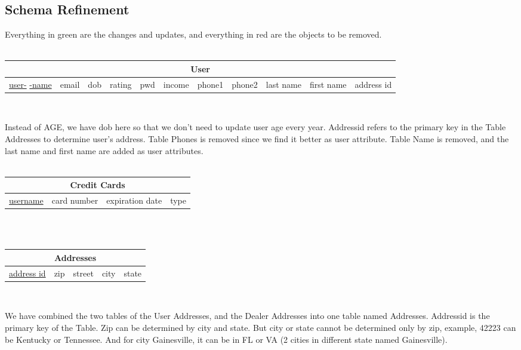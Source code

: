 \documentclass[12pt]{article}
\begin{document}
\subsection{Schema Refinement}
\par Everything in green are the changes and updates, and everything in red are the objects to be removed.\\\\
\begin{tabularx}{\textwidth}{|X|X|X|X|X|X|X|X|X|X|X|}
\hline
\multicolumn{11}{|c|}{User}\\\hline
\scriptsize \underline{user-} \underline{-name} & \scriptsize email & \scriptsize\cellcolor{green!25}dob & \scriptsize rating & \scriptsize pwd & \scriptsize income & \scriptsize\cellcolor{green!25} phone1 & \scriptsize\cellcolor{green!25} phone2 & \scriptsize\cellcolor{green!25} last name & \scriptsize\cellcolor{green!25} first name & \scriptsize\cellcolor{green!25} address id\\\hline
\end{tabularx}
~\\
\par Instead of AGE, we have dob here so that we don't need to update user age every year. Addressid refers to the primary key in the Table Addresses to determine user's address. Table Phones is removed since we find it better as user attribute. Table Name is removed, and the last name and first name are added as user attributes.\\
~\\
\begin{tabularx}{\textwidth}{|X|X|X|X|}
\hline
\multicolumn{4}{|c|}{Credit Cards}\\\hline
\underline{username} & card number & expiration date & type\\\hline
\end{tabularx}
~\\~\\
\begin{tabularx}{\textwidth}{|X|X|X|X|X|}
\hline
\multicolumn{5}{|c|}{\cellcolor{green!25}Addresses}\\\hline
\underline{address id} & \cellcolor{red!25}zip & street & city & state\\\hline
\end{tabularx}
~\\
\par We have combined the two tables of the User Addresses, and the Dealer Addresses into one table named Addresses. Addressid is the primary key of the Table. Zip can be determined by city and state. But city or state cannot be determined only by zip, example, 42223 can be Kentucky or Tennessee. And for city Gainesville, it can be in FL or VA (2 cities in different state named Gainesville).\\
\end{document}
